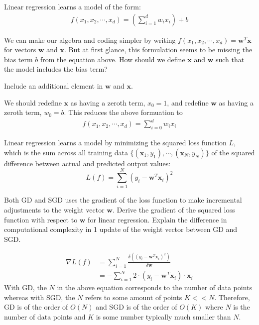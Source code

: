Linear regression learns a model of the form:
\begin{align*}
  f(x_1, x_2, \cdots, x_d) = \left(\sum_{i=1}^d w_i x_i\right) + b
\end{align*}

\begin{problem}[1]
  We can make our algebra and coding simpler by writing $f(x_1, x_2, \cdots, x_d) = \mathbf{w}^T\mathbf{x}$ for vectors $\mathbf{w}$ and $\mathbf{x}$.  But at first glance, this formulation seems to be missing the bias term $b$ from the equation above.  How should we define $\mathbf{x}$ and $\mathbf{w}$ such that the model includes the bias term?
\end{problem}
\begin{hint}
  Include an additional element in $\mathbf{w}$ and $\mathbf{x}$.
\end{hint}
\begin{solution}
  We should redefine $\mathbf{x}$ as having a zeroth term, $x_{0} = 1$, and redefine $\mathbf{w}$ as having a zeroth term, $w_{0} = b$. This reduces the above formuation to 
  \begin{align*}
    f(x_1, x_2, \cdots, x_d) = \sum_{i=0}^d w_i x_i
  \end{align*}
\end{solution}

Linear regression learns a model by minimizing the squared loss function $L$, which is the sum across all training data $\{(\mathbf{x}_1, y_1),\cdots,(\mathbf{x}_N, y_N)\}$ of the squared difference between actual and predicted output values:
\[L(f) = \sum_{i=1}^N (y_i - \mathbf{w}^T\mathbf{x}_i)^2\]

\begin{problem}[2]
  Both GD and SGD uses the gradient of the loss function to make incremental adjustments to the weight vector $\mathbf{w}$. Derive the gradient of the squared loss function with respect to $\mathbf{w}$ for linear regression. Explain the difference in computational complexity in 1 update of the weight vector between GD and SGD. 
\end{problem}
\begin{solution}
  \begin{align*}
    \nabla L(f) & = \sum_{i=1}^N \frac{\delta ((y_i - \mathbf{w}^T\mathbf{x}_i)^2)}{\delta \mathbf{w}} \\
    & = -\sum_{i=1}^N 2\cdot(y_i - \mathbf{w}^T\mathbf{x}_i)\cdot \mathbf{x}_i
  \end{align*}
  With GD, the $N$ in the above equation corresponds to the number of data points whereas with SGD, the $N$ refers to some amount of points $K << N$. Therefore, GD is of the order of $O(N)$ and SGD is of the order of $O(K)$ where $N$ is the number of data points and $K$ is some number typically much smaller than $N$.
\end{solution}

